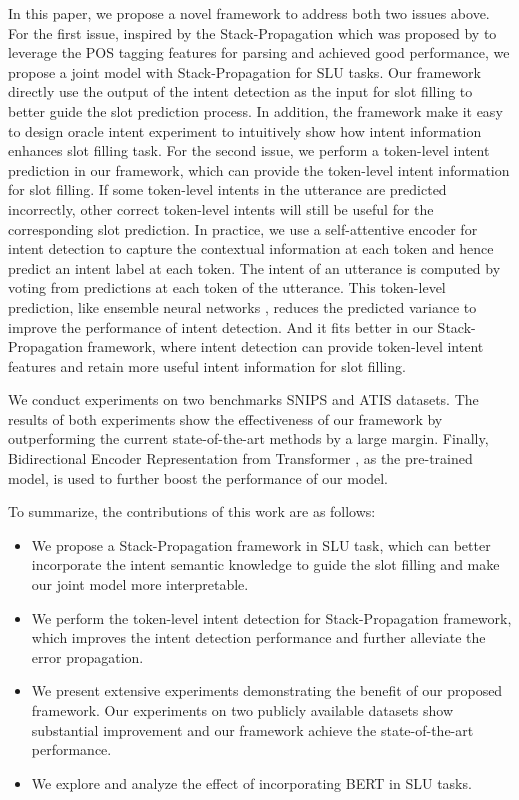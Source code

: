 \documentclass[11pt,a4paper]{article}
\begin{document}
In this paper, we propose a novel framework to address both two issues above.
For the first issue, inspired by the Stack-Propagation which was proposed by  to leverage the POS 
tagging features for parsing and achieved good performance,
we propose a joint model with Stack-Propagation for SLU tasks. Our framework directly use the output of the intent detection as the input for slot filling to better guide the slot prediction process. In addition, the framework make it easy to design oracle intent experiment to intuitively show how intent information enhances slot filling task.
For the second issue, we perform a token-level intent prediction in our framework, which can provide the token-level intent information for slot filling.
If some token-level intents in the utterance are predicted incorrectly, other correct token-level intents will still be useful for the corresponding slot prediction.
In practice,
we use a self-attentive encoder for intent detection to capture the contextual 
information at each token and hence predict an intent label at 
each token.
The intent of an utterance is computed by voting from predictions at each token of the utterance. This token-level prediction, like ensemble neural networks \cite{lee2016stochastic}, reduces the predicted variance to improve the performance of intent detection.
And it fits better in our Stack-Propagation framework, where intent detection
can provide token-level intent features and retain more useful intent information for slot filling. 



We conduct experiments on two benchmarks SNIPS \cite{coucke2018snips} and ATIS \cite{goo2018slot} datasets. The results of both experiments show the effectiveness of our framework by outperforming the current state-of-the-art methods by a large margin. 
Finally, Bidirectional Encoder Representation from Transformer
\cite[BERT]{devlin2018bert}, 
as the pre-trained model, is used to further boost the performance of our model. 

To summarize, the contributions of this work are as follows:
\begin{itemize}
%	
	\item We propose a Stack-Propagation framework in SLU task, which
	 can better incorporate the intent semantic knowledge to guide the slot filling and make our joint model more interpretable.

	\item We perform the token-level intent detection for Stack-Propagation framework, which improves the intent detection performance and further alleviate the error propagation. 
	
	\item We present extensive experiments demonstrating the benefit of our proposed framework. Our experiments on two publicly available datasets show substantial improvement and our framework achieve the state-of-the-art performance.
	
	\item  We explore and analyze the effect of incorporating BERT in SLU tasks.
\end{itemize}
\end{document}
